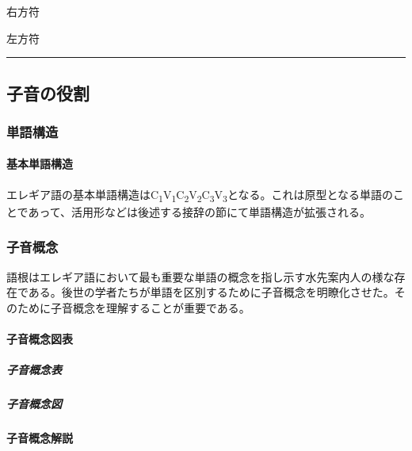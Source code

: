 \documentclass[
  japanese,
]{article}
\begin{document}
右方符

\begin{figure}
\centering
\caption{}\label{rtl-figure}
\end{figure}

左方符

\begin{center}\rule{0.5\linewidth}{0.5pt}\end{center}

\subsection{子音の役割}\label{chapter4}

\subsubsection{単語構造}\label{section4.1}

\paragraph{基本単語構造}\label{subsection4.1.1}

エレギア語の基本単語構造はC\textsubscript{1}V\textsubscript{1}C\textsubscript{2}V\textsubscript{2}C\textsubscript{3}V\textsubscript{3}となる。これは原型となる単語のことであって、活用形などは後述する接辞の節にて単語構造が拡張される。

\subsubsection{子音概念}\label{section4.2}

語根はエレギア語において最も重要な単語の概念を指し示す水先案内人の様な存在である。後世の学者たちが単語を区別するために子音概念を明瞭化させた。そのために子音概念を理解することが重要である。

\paragraph{子音概念図表}\label{subsection4.2.1}

\subparagraph{子音概念表}\label{subsubsection4.2.1.1}

\subparagraph{子音概念図}\label{subsubsection4.2.1.2}

\paragraph{子音概念解説}\label{subsection4.2.2}
\end{document}
